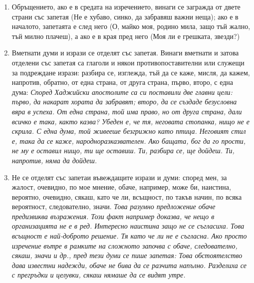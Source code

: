 \begin{enumerate}
    \item Обръщението, ако е в средата на изречението, винаги се загражда от двете страни със запетая (Не е хубаво, синко, да забравяш важни неща); ако е в началото, запетаята е след него (О, майко моя, родино мила, защо тъй жално, тъй милно плачеш), а ако е в края пред него (Моя ли е грешката, звезди?)
    \item Вметнати думи и изрази се отделят със запетая. Винаги вметнати и затова отделени със запетая са глаголи и някои противопоставителни или служещи за подреждане изрази: разбира се, изглежда, тъй да се каже, мисля, да кажем, напротив, обратно, от една страна, от друга страна, първо, второ, с една дума:
    \textit{Според Хаджийски апостолите са си поставили две главни цели: първо, да накарат хората да забравят; второ, да се създаде безусловна вяра в успеха. От една страна, той има право, но от друга страна, дали всичко е така, както казва? Убеден е, че тя, неговата стопанка, нищо не е скрила. С една дума, той живееше безгрижно като птица.
    Неговият стил е, така да се каже, народноразказвателен. Ако бащата, бог да го прости, не му е оставил нищо, ти ще оставиш. Ти, разбира се, ще дойдеш. Ти, напротив, няма да дойдеш.}
    \item Не се отделят със запетаи въвеждащите изрази и думи: според мен, за жалост, очевидно, по мое мнение, обаче, например, може би, наистина, вероятно, очевидно, сякаш, като че ли, всъщност, по такъв начин, по всяка вероятност, следователно, значи. \textit{
    Това разумно предложение обаче предизвиква възражения. Този факт например доказва, че нещо в организацията не е в ред. Интересно наистина защо не се съгласиха. Това всъщност е най-доброто решение. Тя като че ли не е съгласна.
    Ако просто изречение вътре в рамките на сложното започва с обаче, следователно, сякаш, значи и др., пред тези думи се пише запетая: Това обстоятелство дава известни надежди, обаче не бива да се разчита напълно. Разделиха се с прегръдки и целувки, сякаш нямаше да се видят утре.}


\end{enumerate}
